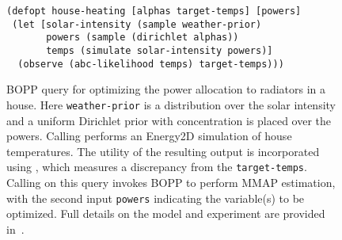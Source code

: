 \begin{figure}[t]
	\vspace{5pt}
	\begin{lstlisting}[basicstyle=\ttfamily\small]
(defopt house-heating [alphas target-temps] [powers]
 (let [solar-intensity (sample weather-prior)
       powers (sample (dirichlet alphas))
       temps (simulate solar-intensity powers)]
  (observe (abc-likelihood temps) target-temps)))
	\end{lstlisting}	
	\vspace{-6pt}
	\caption{BOPP query for optimizing the power allocation to radiators in a house.  Here \lstinline{weather-prior} is a distribution over the solar intensity and a uniform Dirichlet prior with concentration  is placed over the powers. Calling \simulatec performs an Energy2D simulation of house temperatures. The utility of the resulting output is incorporated using \abcl, which measures a discrepancy from the \texttt{target-temps}. Calling \doopt on this query invokes BOPP to perform MMAP estimation, with the second input \lstinline{powers} indicating the variable(s) to be optimized. Full details on the model and
		experiment are provided in~\cite{rainforth2017boppArxiv}.\label{fig:house-heating-code}}
	\vspace{-5pt}
\end{figure}


